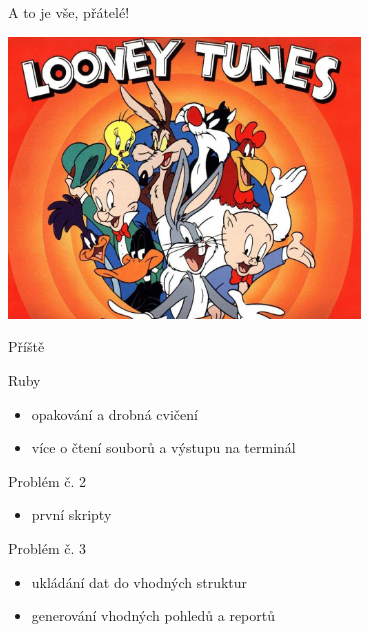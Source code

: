 \documentclass{beamer}
\begin{document}
\begin{frame}{A to je vše, přátelé!}
  \begin{center}
    \includegraphics[width=0.7\textwidth]{looney_tunes}
  \end{center}
\end{frame}

\begin{frame}{Příště}
  \begin{block}{Ruby}
    \begin{itemize}
      \item opakování a drobná cvičení
      \item více o čtení souborů a výstupu na terminál
    \end{itemize}
  \end{block}
  \begin{block}{Problém č. 2}
    \begin{itemize}
      \item první skripty
    \end{itemize}
  \end{block}
  \begin{block}{Problém č. 3}
    \begin{itemize}
      \item ukládání dat do vhodných struktur
      \item generování vhodných pohledů a reportů
    \end{itemize}
  \end{block}
\end{frame}
\end{document}
